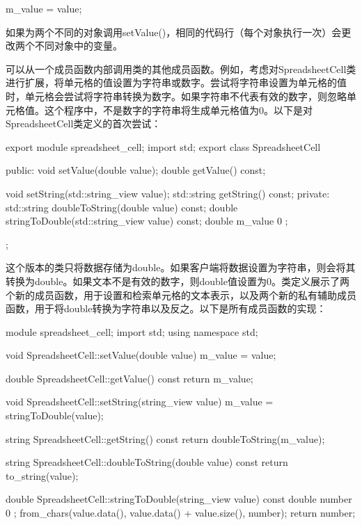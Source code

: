 \begin{cpp}
m_value = value;
\end{cpp}

如果为两个不同的对象调用setValue()，相同的代码行（每个对象执行一次）会更改两个不同对象中的变量。


可以从一个成员函数内部调用类的其他成员函数。例如，考虑对SpreadsheetCell类进行扩展，将单元格的值设置为字符串或数字。尝试将字符串设置为单元格的值时，单元格会尝试将字符串转换为数字。如果字符串不代表有效的数字，则忽略单元格值。这个程序中，不是数字的字符串将生成单元格值为0。以下是对SpreadsheetCell类定义的首次尝试：

\begin{cpp}
export module spreadsheet_cell;
import std;
export class SpreadsheetCell
{
    public:
        void setValue(double value);
        double getValue() const;

        void setString(std::string_view value);
        std::string getString() const;
    private:
        std::string doubleToString(double value) const;
        double stringToDouble(std::string_view value) const;
        double m_value { 0 };
};
\end{cpp}

这个版本的类只将数据存储为double。如果客户端将数据设置为字符串，则会将其转换为double。如果文本不是有效的数字，则double值设置为0。类定义展示了两个新的成员函数，用于设置和检索单元格的文本表示，以及两个新的私有辅助成员函数，用于将double转换为字符串以及反之。以下是所有成员函数的实现：

\begin{cpp}
module spreadsheet_cell;
import std;
using namespace std;

void SpreadsheetCell::setValue(double value)
{
    m_value = value;
}

double SpreadsheetCell::getValue() const
{
    return m_value;
}

void SpreadsheetCell::setString(string_view value)
{
    m_value = stringToDouble(value);
}

string SpreadsheetCell::getString() const
{
    return doubleToString(m_value);
}

string SpreadsheetCell::doubleToString(double value) const
{
    return to_string(value);
}

double SpreadsheetCell::stringToDouble(string_view value) const
{
    double number { 0 };
    from_chars(value.data(), value.data() + value.size(), number);
    return number;
}
\end{cpp}

